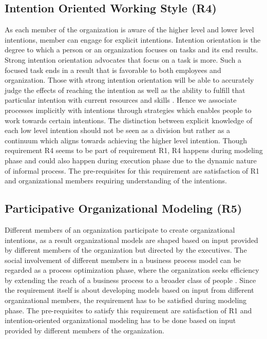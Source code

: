 \subsection{Intention Oriented Working Style (R4)}
As each member of the organization is aware of the higher level and lower level intentions, member can engage for explicit intentions. Intention orientation is the degree to which a person or an organization focuses on tasks and its end results. Strong intention orientation advocates that focus on a task is more. Such a focused task ends in a result that is favorable to both employees and organization. Those with strong intention orientation will be able to accurately judge the effects of reaching the intention as well as the ability to fulfill that particular intention with current resources and skills \cite{Lacom}. Hence we associate processes implicitly with intentions through strategies which enables people to work towards certain intentions. The distinction between explicit knowledge of each low level intention should not be seen as a division but rather as a continuum which aligns towards achieving the higher level intention. Though requirement R4 seems to be part of requirement R1, R4 happens during modeling phase and could also happen during execution phase due to the dynamic nature of informal process. The pre-requisites for this requirement are satisfaction of R1 and organizational members requiring understanding of the intentions.  

\subsection{Participative Organizational Modeling (R5)}
 Different members of an organization participate to create organizational intentions, as a result organizational models are shaped based on input provided by different members of the organization but directed by the executives. The social involvement of different members in a business process model can be regarded as a process optimization phase, where the organization seeks efficiency by extending the reach of a business process to a broader class of people \cite{Brambilla2012}. Since the requirement itself is about developing models based on input from different organizational members, the requirement has to be satisfied during modeling phase. The pre-requisites to satisfy this requirement are satisfaction of R1 and intention-oriented organizational modeling has to be done based on input provided by different members of the organization.  
 
